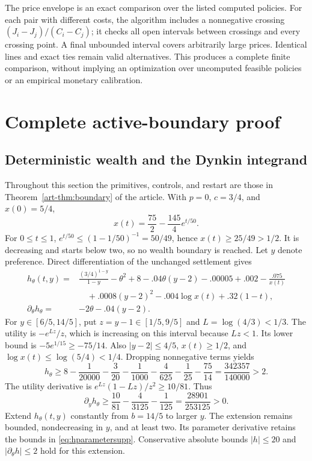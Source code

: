 The price envelope is an exact comparison over the listed computed policies. For each pair with different costs, the algorithm includes a nonnegative crossing $(J_i-J_j)/(C_i-C_j)$; it checks all open intervals between crossings and every crossing point. A final unbounded interval covers arbitrarily large prices. Identical lines and exact ties remain valid alternatives. This produces a complete finite comparison, without implying an optimization over uncomputed feasible policies or an empirical monetary calibration.

\section{Complete active-boundary proof}\label{app:boundary}
\subsection{Deterministic wealth and the Dynkin integrand}
Throughout this section the primitives, controls, and restart are those in Theorem~\ref{art-thm:boundary} of the article. With $p=0$, $c=3/4$, and $x(0)=5/4$,
\begin{equation}
 x(t)=\frac{75}{2}-\frac{145}{4}e^{t/50}.
\end{equation}
For $0\le t\le1$, $e^{t/50}\le(1-1/50)^{-1}=50/49$, hence $x(t)\ge25/49>1/2$. It is decreasing and starts below two, so no wealth boundary is reached. Let $y$ denote preference. Direct differentiation of the unchanged settlement gives
\begin{align}
 h_\theta(t,y)={}&\frac{(3/4)^{1-y}}{1-y}-\theta^2+8
 -.04\theta(y-2)-.00005+.002-\frac{.075}{x(t)}\nonumber\\
 &\quad+.0008(y-2)^2-.004\log x(t)+.32(1-t),\label{eq:hsupp}\\
 \partial_\theta h_\theta={}&-2\theta-.04(y-2).\label{eq:hparametersupp}
\end{align}
For $y\in[6/5,14/5]$, put $z=y-1\in[1/5,9/5]$ and $L=\log(4/3)<1/3$. The utility is $-e^{Lz}/z$, which is increasing on this interval because $Lz<1$. Its lower bound is $-5e^{1/15}\ge-75/14$. Also $|y-2|\le4/5$, $x(t)\ge1/2$, and $\log x(t)\le\log(5/4)<1/4$. Dropping nonnegative terms yields
\begin{equation}
 h_\theta\ge8-\frac1{20000}-\frac3{20}-\frac1{1000}
 -\frac4{625}-\frac1{25}-\frac{75}{14}
 =\frac{342357}{140000}>2.\label{eq:hlower}
\end{equation}
The utility derivative is $e^{Lz}(1-Lz)/z^2\ge10/81$. Thus
\begin{equation}
 \partial_yh_\theta\ge\frac{10}{81}-\frac4{3125}-\frac1{125}
 =\frac{28901}{253125}>0.\label{eq:hylower}
\end{equation}
Extend $h_\theta(t,y)$ constantly from $b=14/5$ to larger $y$. The extension remains bounded, nondecreasing in $y$, and at least two. Its parameter derivative retains the bounds in \eqref{eq:hparametersupp}. Conservative absolute bounds $|h|\le20$ and $|\partial_\theta h|\le2$ hold for this extension.


